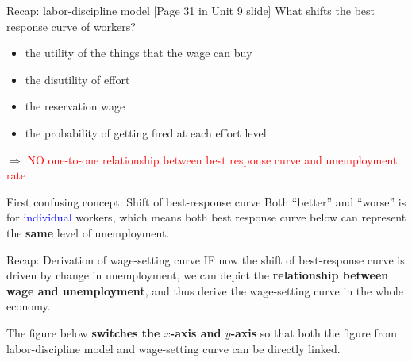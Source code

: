 \documentclass{beamer}
\newcommand{\blue}[1]{\textcolor{blue}{#1}}
\newcommand{\red}[1]{\textcolor{red}{#1}}
\begin{document}
\begin{frame}{Recap: labor-discipline model}
\label{slide:Recap__labor_discipline_model}
    [Page 31 in Unit 9 slide] What shifts the best response curve of workers?
    \begin{itemize}
        \item the utility of the things that the wage can buy
        \item the disutility of effort
        \item the reservation wage
        \item the probability of getting fired at each effort level
    \end{itemize}
    $ \Rightarrow  $ \red{NO one-to-one relationship between best response curve and unemployment rate}
\end{frame}

\begin{frame}{First confusing concept: Shift of best-response curve}
\label{First_confusing_concept__Shift_of_best_response_curve}
    Both ``better'' and ``worse'' is for \blue{individual} workers, which means both best response curve below can represent the \textbf{same} level of unemployment.


\end{frame}

\begin{frame}{Recap: Derivation of wage-setting curve}
\label{slide:Recap__Derivation_of_wage_setting_curve}
    IF now the shift of best-response curve is driven by change in unemployment, we can depict the \textbf{relationship between wage and unemployment}, and thus derive the wage-setting curve in the whole economy.

    The figure below \textbf{switches the $ x $-axis and $ y $-axis} so that both the figure from labor-discipline model and wage-setting curve can be directly linked.

\end{frame}
\end{document}
